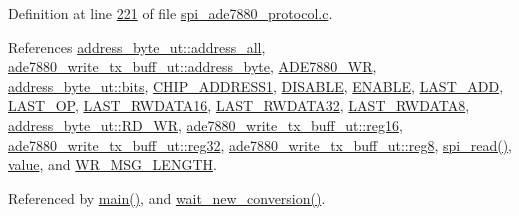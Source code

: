 Definition at line \hyperlink{a00040_source_l00221}{221} of file \hyperlink{a00040_source}{spi\-\_\-ade7880\-\_\-protocol.\-c}.



References \hyperlink{a00041_source_l00023}{address\-\_\-byte\-\_\-ut\-::address\-\_\-all}, \hyperlink{a00041_source_l00168}{ade7880\-\_\-write\-\_\-tx\-\_\-buff\-\_\-ut\-::address\-\_\-byte}, \hyperlink{a00041_source_l00013}{A\-D\-E7880\-\_\-\-W\-R}, \hyperlink{a00011_ae121725fb28cc26495969d71e0e0d42e}{address\-\_\-byte\-\_\-ut\-::bits}, \hyperlink{a00037_source_l00039}{C\-H\-I\-P\-\_\-\-A\-D\-D\-R\-E\-S\-S1}, \hyperlink{a00037_source_l00041}{D\-I\-S\-A\-B\-L\-E}, \hyperlink{a00037_source_l00040}{E\-N\-A\-B\-L\-E}, \hyperlink{a00036_source_l00314}{L\-A\-S\-T\-\_\-\-A\-D\-D}, \hyperlink{a00036_source_l00316}{L\-A\-S\-T\-\_\-\-O\-P}, \hyperlink{a00036_source_l00049}{L\-A\-S\-T\-\_\-\-R\-W\-D\-A\-T\-A16}, \hyperlink{a00036_source_l00050}{L\-A\-S\-T\-\_\-\-R\-W\-D\-A\-T\-A32}, \hyperlink{a00036_source_l00048}{L\-A\-S\-T\-\_\-\-R\-W\-D\-A\-T\-A8}, \hyperlink{a00041_source_l00026}{address\-\_\-byte\-\_\-ut\-::\-R\-D\-\_\-\-W\-R}, \hyperlink{a00041_source_l00172}{ade7880\-\_\-write\-\_\-tx\-\_\-buff\-\_\-ut\-::reg16}, \hyperlink{a00041_source_l00173}{ade7880\-\_\-write\-\_\-tx\-\_\-buff\-\_\-ut\-::reg32}, \hyperlink{a00041_source_l00171}{ade7880\-\_\-write\-\_\-tx\-\_\-buff\-\_\-ut\-::reg8}, \hyperlink{a00040_source_l00147}{spi\-\_\-read()}, \hyperlink{a00041_source_l00195}{value}, and \hyperlink{a00041_source_l00016}{W\-R\-\_\-\-M\-S\-G\-\_\-\-L\-E\-N\-G\-T\-H}.



Referenced by \hyperlink{a00035_source_l00198}{main()}, and \hyperlink{a00035_source_l00122}{wait\-\_\-new\-\_\-conversion()}.


